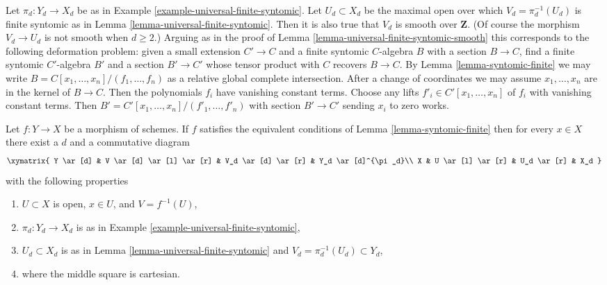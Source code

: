 \begin{remark}
\label{remark-universal-finite-syntomic-smooth-top}
Let $\pi_d : Y_d \to X_d$ be as in
Example \ref{example-universal-finite-syntomic}.
Let $U_d \subset X_d$ be the maximal open over which
$V_d = \pi_d^{-1}(U_d)$ is finite syntomic as in
Lemma \ref{lemma-universal-finite-syntomic}.
Then it is also true that $V_d$ is smooth over $\mathbf{Z}$.
(Of course the morphism $V_d \to U_d$ is not smooth when $d \geq 2$.)
Arguing as in the proof of Lemma \ref{lemma-universal-finite-syntomic-smooth}
this corresponds to the following deformation
problem: given a small extension $C' \to C$ and
a finite syntomic $C$-algebra $B$ with a section $B \to C$,
find a finite syntomic $C'$-algebra $B'$ and a section $B' \to C'$
whose tensor product with $C$ recovers $B \to C$.
By Lemma \ref{lemma-syntomic-finite} we may write
$B = C[x_1, \ldots, x_n]/(f_1, \ldots, f_n)$ as
a relative global complete intersection.
After a change of coordinates we may assume
$x_1, \ldots, x_n$ are in the kernel of $B \to C$.
Then the polynomials $f_i$ have vanishing constant terms.
Choose any lifts $f'_i \in C'[x_1, \ldots, x_n]$ of $f_i$
with vanishing constant terms. Then 
$B' = C'[x_1, \ldots, x_n]/(f'_1, \ldots, f'_n)$
with section $B' \to C'$ sending $x_i$ to zero works.
\end{remark}

\begin{lemma}
\label{lemma-locally-comes-from-universal-finite}
Let $f : Y \to X$ be a morphism of schemes. If $f$ satisfies the equivalent
conditions of Lemma \ref{lemma-syntomic-finite} then for every
$x \in X$ there exist a $d$ and a commutative diagram
$$
\xymatrix{
Y \ar[d] &
V \ar[d] \ar[l] \ar[r] &
V_d \ar[d] \ar[r] &
Y_d \ar[d]^{\pi_d}\\
X &
U \ar[l] \ar[r] &
U_d \ar[r] &
X_d
}
$$
with the following properties
\begin{enumerate}
\item $U \subset X$ is open, $x \in U$, and $V = f^{-1}(U)$,
\item $\pi_d : Y_d \to X_d$ is as in
Example \ref{example-universal-finite-syntomic},
\item $U_d \subset X_d$ is as in Lemma \ref{lemma-universal-finite-syntomic}
and $V_d = \pi_d^{-1}(U_d) \subset Y_d$,
\item where the middle square is cartesian.
\end{enumerate}
\end{lemma}

